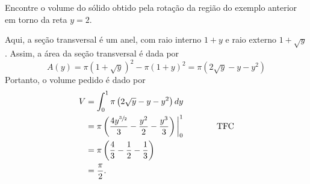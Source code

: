 \begin{example}
  Encontre o volume do sólido obtido pela rotação da região do
  exemplo anterior em torno da reta $y=2$.

  \solution
  Aqui, a seção transversal é um anel, com raio interno $1+y$ e
  raio externo $1+ \sqrt{y}$.
  Assim, a área da seção transversal é dada por
  \[
  A(y)
  = \pi \left( 1+\sqrt{y} \right)^2 - \pi (1+y)^2
  = \pi \left( 2\sqrt{y}-y-y^2 \right)
  \]
  Portanto, o volume pedido é dado por
  \begin{align*}
    V
    & = \int_0^1 \pi \left(2\sqrt{y}-y-y^2\right) dy \\
    & = \pi \left(
    \frac{4y^{\sfrac{3}{2}}}{3}-  \frac{y^2}{2}- \frac{y^3}{3}
    \right) \bigg\rvert_{0}^{1}  \qquad\qquad\text{TFC} \\
    & = \pi \left( \frac{4}{3} - \frac{1}{2} - \frac{1}{3}\right) \\
    & = \frac{\pi}{2}.
  \end{align*}
\end{example}

